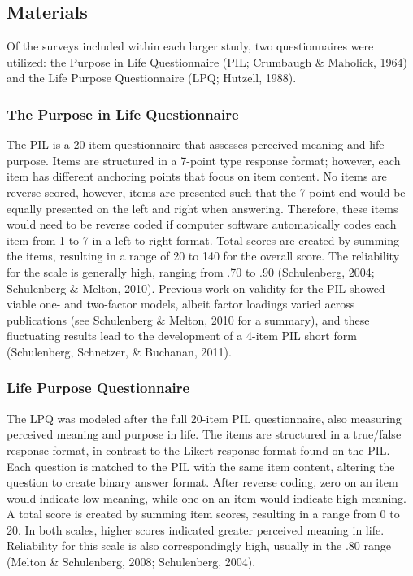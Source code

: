 \documentclass[english,man, mask]{apa6}
\theoremstyle{definition}
\theoremstyle{definition}
\theoremstyle{definition}
\theoremstyle{remark}
\begin{document}
\subsection{Materials}\label{materials}

Of the surveys included within each larger study, two questionnaires
were utilized: the Purpose in Life Questionnaire (PIL; Crumbaugh \&
Maholick, 1964) and the Life Purpose Questionnaire (LPQ; Hutzell, 1988).

\subsubsection{The Purpose in Life
Questionnaire}\label{the-purpose-in-life-questionnaire}

The PIL is a 20-item questionnaire that assesses perceived meaning and
life purpose. Items are structured in a 7-point type response format;
however, each item has different anchoring points that focus on item
content. No items are reverse scored, however, items are presented such
that the 7 point end would be equally presented on the left and right
when answering. Therefore, these items would need to be reverse coded if
computer software automatically codes each item from 1 to 7 in a left to
right format. Total scores are created by summing the items, resulting
in a range of 20 to 140 for the overall score. The reliability for the
scale is generally high, ranging from .70 to .90 (Schulenberg, 2004;
Schulenberg \& Melton, 2010). Previous work on validity for the PIL
showed viable one- and two-factor models, albeit factor loadings varied
across publications (see Schulenberg \& Melton, 2010 for a summary), and
these fluctuating results lead to the development of a 4-item PIL short
form (Schulenberg, Schnetzer, \& Buchanan, 2011).

\subsubsection{Life Purpose
Questionnaire}\label{life-purpose-questionnaire}

The LPQ was modeled after the full 20-item PIL questionnaire, also
measuring perceived meaning and purpose in life. The items are
structured in a true/false response format, in contrast to the Likert
response format found on the PIL. Each question is matched to the PIL
with the same item content, altering the question to create binary
answer format. After reverse coding, zero on an item would indicate low
meaning, while one on an item would indicate high meaning. A total score
is created by summing item scores, resulting in a range from 0 to 20. In
both scales, higher scores indicated greater perceived meaning in life.
Reliability for this scale is also correspondingly high, usually in the
.80 range (Melton \& Schulenberg, 2008; Schulenberg, 2004).
\end{document}
